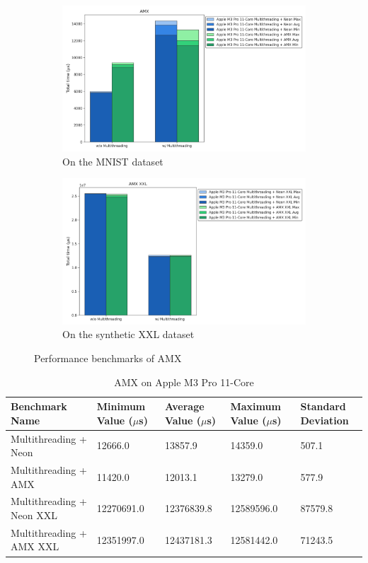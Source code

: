 \documentclass[modern,longauthor]{aastex7}
\begin{document}
\begin{figure}[htb!]
\centering
\begin{subfigure}{.5\textwidth}
  \centering
  \includegraphics[width=\linewidth]{Graphs/AMX.png}
  \caption{On the MNIST dataset}
 \label{fig:amx_mnist}
\end{subfigure}%
\begin{subfigure}{.5\textwidth}
  \centering
  \includegraphics[width=\linewidth]{Graphs/AMX XXL.png}
  \caption{On the synthetic XXL dataset}
 \label{fig:amx_xxl}
\end{subfigure}
\caption{Performance benchmarks of AMX}
\label{fig:amx}
\end{figure}

\begin{table}[htb!]
\centering
\caption{AMX on Apple M3 Pro 11-Core\label{tab:amx}}
\begin{tabular}{p{5cm} p{2cm} p{2cm} p{2cm} p{2cm}}
\hline
Benchmark Name & Minimum Value ($\mu$s) & Average Value ($\mu$s) & Maximum Value ($\mu$s) & Standard Deviation \\
\hline
Multithreading + Neon & 12666.0 & 13857.9 & 14359.0 & 507.1 \\
Multithreading + AMX & 11420.0 & 12013.1 & 13279.0 & 577.9 \\
\hline
Multithreading + Neon XXL & 12270691.0 & 12376839.8 & 12589596.0 & 87579.8 \\
Multithreading + AMX XXL & 12351997.0 & 12437181.3 & 12581442.0 & 71243.5 \\
\hline
\end{tabular}
\end{table}
\FloatBarrier
\end{document}

